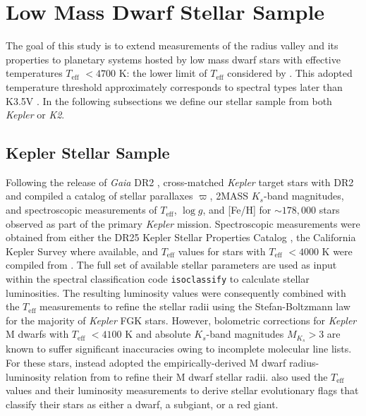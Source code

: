 \documentclass[twocolumn]{emulateapj}
\newcommand{\gaia}[1]{\emph{Gaia}#1}
\newcommand{\kepler}[1]{\emph{Kepler}#1}
\newcommand{\ktwo}[1]{\emph{K2}#1}
\newcommand{\teff}[1]{$T_{\text{eff}}$#1}
\newcommand{\logg}[1]{$\log{g}$#1}
\begin{document}
\section{Low Mass Dwarf Stellar Sample} \label{sect:stars}

The goal of this study is to extend measurements of the radius valley and its properties to planetary systems hosted
by low mass dwarf stars with effective temperatures \teff{} $<4700$ K: the lower limit of \teff{}
considered by \cite{fulton18}. This adopted temperature threshold approximately corresponds to spectral types later than
K3.5V \citep{pecaut13}. In the following subsections we define our stellar sample from both \kepler{} or \ktwo{.}

\subsection{Kepler Stellar Sample} \label{sect:kep}
Following the release of \gaia{} DR2 \citep{lindegren18}, \cite{berger18} cross-matched \kepler{} target stars
with DR2 and compiled a catalog of stellar
parallaxes $\varpi$, 2MASS $K_s$-band magnitudes, and spectroscopic measurements of \teff{,} \logg{,} and [Fe/H]
for $\sim 178,000$ stars observed as part of the primary \kepler{} mission. Spectroscopic measurements were obtained from
either the DR25
Kepler Stellar Properties Catalog \citep[KSPC;][]{mathur17}, the California
Kepler Survey \citep[CKS;][]{petigura17} where available, and \teff{} values for stars with \teff{} $<4000$ K were compiled from
\cite{gaidos16}. The full set of available stellar parameters are used as input within the spectral classification code
\texttt{isoclassify} \citep{huber17} to calculate stellar luminosities. The resulting luminosity values were consequently combined
with the \teff{} measurements to refine the stellar radii using the Stefan-Boltzmann law for the majority of \kepler{} FGK stars.
However, bolometric corrections for \kepler{} M dwarfs with \teff{} $<4100$ K
and absolute $K_s$-band magnitudes $M_{K_s}>3$ are known to suffer significant inaccuracies owing to incomplete
molecular line lists. For these stars, \cite{berger18} instead adopted the empirically-derived M dwarf radius-luminosity
relation from \cite{mann15} to refine their M dwarf stellar radii. \cite{berger18} also used the \teff{} values and their
luminosity measurements to derive stellar evolutionary flags that classify their stars as either a dwarf, a subgiant, or a
red giant.
\end{document}
